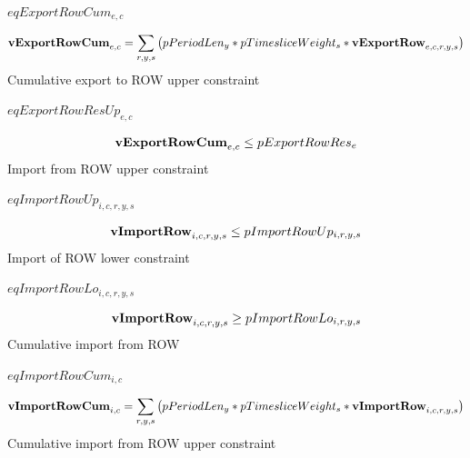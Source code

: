 \documentclass{article}
\begin{document}
$eqExportRowCum_{e,c}$





\begin{dmath}
{\bf vExportRowCum}_{e,c}  =  \sum_{r,y,s}{\left(pPeriodLen_{y}*pTimesliceWeight_{s}*{\bf vExportRow}_{e,c,r,y,s}\right)}
\end{dmath}
Cumulative export to ROW upper constraint







$eqExportRowResUp_{e,c}$





\begin{dmath}
{\bf vExportRowCum}_{e,c}  \le  pExportRowRes_{e}
\end{dmath}
Import from ROW upper constraint







$eqImportRowUp_{i,c,r,y,s}$





\begin{dmath}
{\bf vImportRow}_{i,c,r,y,s}  \le  pImportRowUp_{i,r,y,s}
\end{dmath}
Import of ROW lower constraint







$eqImportRowLo_{i,c,r,y,s}$





\begin{dmath}
{\bf vImportRow}_{i,c,r,y,s}  \ge  pImportRowLo_{i,r,y,s}
\end{dmath}
Cumulative import from ROW







$eqImportRowCum_{i,c}$





\begin{dmath}
{\bf vImportRowCum}_{i,c}  =  \sum_{r,y,s}{\left(pPeriodLen_{y}*pTimesliceWeight_{s}*{\bf vImportRow}_{i,c,r,y,s}\right)}
\end{dmath}
Cumulative import from ROW upper constraint
\end{document}
